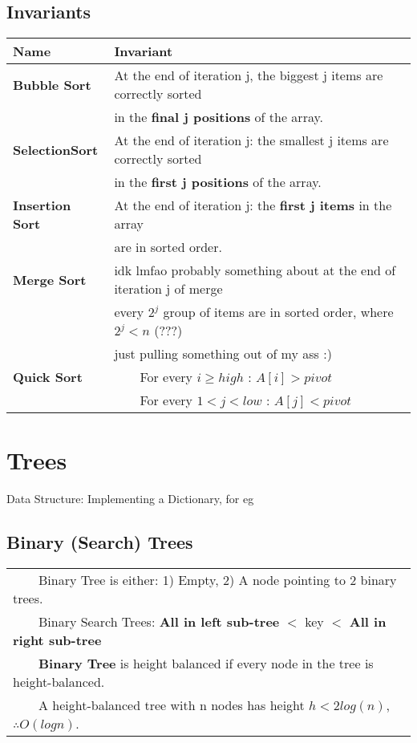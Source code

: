 \documentclass{article}
\newcommand{\tabitem}{~~\llap{\textbullet}~~}
\begin{document}
    \subsection{Invariants}
    \begin{tabular}{|l||l|}
        \toprule
        \textbf{Name} & \textbf{Invariant}\\
        \midrule
        \midrule
        \textbf{Bubble Sort} &  At the end of iteration j, the biggest j items are correctly sorted \\
        & in the \textbf{final j positions} of the array.\\
        \hline
        \textbf{SelectionSort} & At the end of iteration j: the smallest j items are correctly sorted \\
        & in the \textbf{first j positions} of the array.\\
        \hline
        \textbf{Insertion Sort} & At the end of iteration j: the \textbf{first j items} in the array \\
        &  are in sorted order.\\
        \hline
        \textbf{Merge Sort} & idk lmfao probably something about at the end of iteration j of merge\\
        & every $2^{j}$ group of items are in sorted order, where $2^{j} < n$ (???)\\
        & just pulling something out of my ass :)\\ 
        \hline
        \textbf{Quick Sort} & \tabitem For every $i \geq high$ : $A[i] > pivot$\\
        & \tabitem For every $1 < j < low$ : $A[j] < pivot$\\
        \bottomrule
    \end{tabular}

    \pagebreak

    \section{Trees}

    Data Structure: Implementing a Dictionary, for eg

    \subsection{Binary (Search) Trees}

    \begin{tabular}{l}
        \tabitem Binary Tree is either: 1) Empty, 2) A node pointing to 2 binary trees.\\
        \tabitem Binary Search Trees: \textbf{All in left sub-tree} $<$ key $<$ \textbf{All in right sub-tree}\\
        \tabitem \textbf{Binary Tree} is height balanced if every node in the tree is height-balanced.\\
        \tabitem A height-balanced tree with n nodes has height $h < 2log(n)$, $\therefore O(logn)$.\\
    \end{tabular}
    \bigskip
\end{document}

